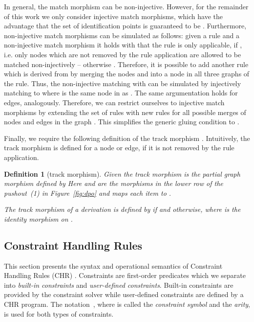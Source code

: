 \documentclass{tlp}
\newtheorem{definition}{Definition}[section]
\begin{document}
In general, the match morphism  can be non-injective. However, for the
remainder of this work we only consider injective match morphisms, which have the
advantage that the set  of identification points is guaranteed to be
. Furthermore, non-injective match morphisms can be simulated as
follows: given a rule  and a non-injective match morphism  it holds
 with  that the rule is only
applicable, if , i.e. only nodes which are not removed by the
rule application are allowed to be matched non-injectively -- otherwise . Therefore, it is possible to add another rule  which is
derived from  by merging the nodes  and  into a node  in all three
graphs of the rule. Thus, the non-injective matching with  can be
simulated by injectively matching  to  where  is the same
node in  as . The same argumentation holds for edges, analogously.
Therefore, we can restrict ourselves to injective match morphisms by extending
the set of rules with new rules for all possible merges of nodes and edges in the
graph . This simplifies the generic gluing condition to .

Finally, we require the following definition of the track morphism
\cite{Plump1995}. Intuitively, the track morphism is defined for a node or edge,
if it is not removed by the rule application.

\begin{definition}[track morphism]\label{def:track} Given 
the \emph{track morphism}  is the partial
graph morphism defined by 
Here  and  are the morphisms in the
lower row of the pushout~(1) in Figure~\ref{fig:dpo} and  maps each item  to .

The track morphism of a derivation  is defined by
 if  and  otherwise, where
 is the identity morphism on .
\end{definition}


\subsection{Constraint Handling Rules}
\label{sec:prelim:chr}
This section presents the syntax and operational semantics of Constraint Handling
Rules (CHR) \cite{chr_survey_tplp08,fruehwirth09}. Constraints are first-order
predicates which we separate into \emph{built-in constraints} and
\emph{user-defined constraints}. Built-in constraints are provided by the
constraint solver while user-defined constraints are defined by a CHR program.
The notation~, where  is called the \emph{constraint symbol} and  the
\emph{arity}, is used for both types of constraints.
\end{document}
